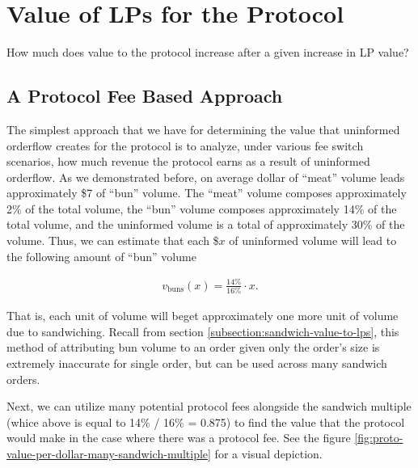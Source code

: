 \section{Value of LPs for the Protocol} \label{section:protocol-lpcapital-value}

How much does value to the protocol increase after a given increase in LP value?

\subsection{A Protocol Fee Based Approach}

    The simplest approach that we have for determining the value that uninformed orderflow creates for the protocol is to analyze, under various fee switch scenarios, how much revenue the protocol earns as a result of uninformed orderflow. As we demonstrated before, on average dollar of ``meat'' volume leads approximately \$7 of ``bun'' volume. The ``meat'' volume composes approximately 2\% of the total volume, the ``bun'' volume composes approximately 14\% of the total volume, and the uninformed volume is a total of approximately 30\% of the volume. Thus, we can estimate that each \$$x$ of uninformed volume will lead to the following amount of ``bun'' volume

        \begin{align*}
            v_{\text{buns}}(x) = \frac{14\%}{16\%} \cdot x.
        \end{align*}
        
    That is, each unit of volume will beget approximately one more unit of volume due to sandwiching. Recall from section \ref{subsection:sandwich-value-to-lps}, this method of attributing bun volume to an order given only the order's size is extremely inaccurate for single order, but can be used across many sandwich orders.

    Next, we can utilize many potential protocol fees alongside the sandwich multiple (whice above is equal to 14\% / 16\% = 0.875) to find the value that the protocol would make in the case where there was a protocol fee. See the figure \ref{fig:proto-value-per-dollar-many-sandwich-multiple} for a visual depiction.


